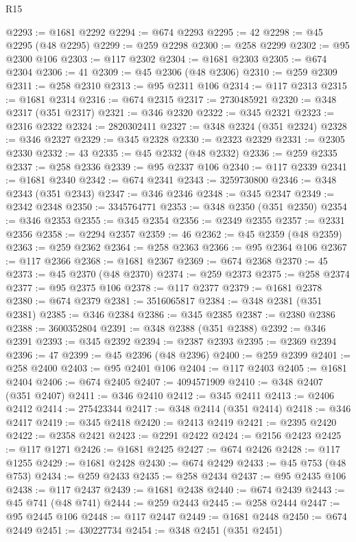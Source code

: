 \begin{lexlean}{R15}
\begin{coremodule}
{{{{{{{{{{{{{{{{{{{{{{{{{{{{{{{{{{{{{{{{{{{{{{{{{{{{{{{{{{{{{{{{{{{{{{@2293 := @1681 @2292
@2294 := @674 @2293
@2295 := 42
@2298 := @45 @2295 (@48 @2295)
@2299 := @259 @2298
@2300 := @258 @2299
@2302 := @95 @2300 @106
@2303 := @117 @2302
@2304 := @1681 @2303
@2305 := @674 @2304
@2306 := 41
@2309 := @45 @2306 (@48 @2306)
@2310 := @259 @2309
@2311 := @258 @2310
@2313 := @95 @2311 @106
@2314 := @117 @2313
@2315 := @1681 @2314
@2316 := @674 @2315
@2317 := 2730485921
@2320 := @348 @2317 (@351 @2317)
@2321 := @346 @2320
@2322 := @345 @2321
@2323 := @2316 @2322
@2324 := 2820302411
@2327 := @348 @2324 (@351 @2324)
@2328 := @346 @2327
@2329 := @345 @2328
@2330 := @2323 @2329
@2331 := @2305 @2330
@2332 := 43
@2335 := @45 @2332 (@48 @2332)
@2336 := @259 @2335
@2337 := @258 @2336
@2339 := @95 @2337 @106
@2340 := @117 @2339
@2341 := @1681 @2340
@2342 := @674 @2341
@2343 := 3259730800
@2346 := @348 @2343 (@351 @2343)
@2347 := @346 @2346
@2348 := @345 @2347
@2349 := @2342 @2348
@2350 := 3345764771
@2353 := @348 @2350 (@351 @2350)
@2354 := @346 @2353
@2355 := @345 @2354
@2356 := @2349 @2355
@2357 := @2331 @2356
@2358 := @2294 @2357
@2359 := 46
@2362 := @45 @2359 (@48 @2359)
@2363 := @259 @2362
@2364 := @258 @2363
@2366 := @95 @2364 @106
@2367 := @117 @2366
@2368 := @1681 @2367
@2369 := @674 @2368
@2370 := 45
@2373 := @45 @2370 (@48 @2370)
@2374 := @259 @2373
@2375 := @258 @2374
@2377 := @95 @2375 @106
@2378 := @117 @2377
@2379 := @1681 @2378
@2380 := @674 @2379
@2381 := 3516065817
@2384 := @348 @2381 (@351 @2381)
@2385 := @346 @2384
@2386 := @345 @2385
@2387 := @2380 @2386
@2388 := 3600352804
@2391 := @348 @2388 (@351 @2388)
@2392 := @346 @2391
@2393 := @345 @2392
@2394 := @2387 @2393
@2395 := @2369 @2394
@2396 := 47
@2399 := @45 @2396 (@48 @2396)
@2400 := @259 @2399
@2401 := @258 @2400
@2403 := @95 @2401 @106
@2404 := @117 @2403
@2405 := @1681 @2404
@2406 := @674 @2405
@2407 := 4094571909
@2410 := @348 @2407 (@351 @2407)
@2411 := @346 @2410
@2412 := @345 @2411
@2413 := @2406 @2412
@2414 := 275423344
@2417 := @348 @2414 (@351 @2414)
@2418 := @346 @2417
@2419 := @345 @2418
@2420 := @2413 @2419
@2421 := @2395 @2420
@2422 := @2358 @2421
@2423 := @2291 @2422
@2424 := @2156 @2423
@2425 := @117 @1271
@2426 := @1681 @2425
@2427 := @674 @2426
@2428 := @117 @1255
@2429 := @1681 @2428
@2430 := @674 @2429
@2433 := @45 @753 (@48 @753)
@2434 := @259 @2433
@2435 := @258 @2434
@2437 := @95 @2435 @106
@2438 := @117 @2437
@2439 := @1681 @2438
@2440 := @674 @2439
@2443 := @45 @741 (@48 @741)
@2444 := @259 @2443
@2445 := @258 @2444
@2447 := @95 @2445 @106
@2448 := @117 @2447
@2449 := @1681 @2448
@2450 := @674 @2449
@2451 := 430227734
@2454 := @348 @2451 (@351 @2451)
}}}}}}}}}}}}}}}}}}}}}}}}}}}}}}}}}}}}}}}}}}}}}}}}}}}}}}}}}}}}}}}}}}}}}}
\end{coremodule}
\end{lexlean}

